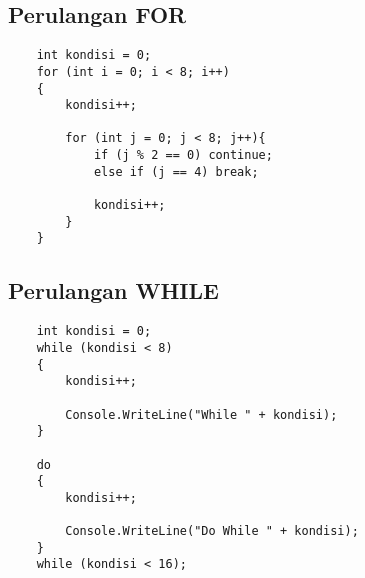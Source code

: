 \documentclass{book}
\begin{document}
	\subsection{Perulangan FOR}
	\begin{lstlisting}
	int kondisi = 0;
	for (int i = 0; i < 8; i++)
	{
		kondisi++;
		
		for (int j = 0; j < 8; j++){
			if (j % 2 == 0) continue;
			else if (j == 4) break;
			
			kondisi++;
		}
	}
	\end{lstlisting}

	\subsection{Perulangan WHILE}
	\begin{lstlisting}
	int kondisi = 0;
	while (kondisi < 8)
	{
		kondisi++;
		
		Console.WriteLine("While " + kondisi);
	}
	
	do
	{
		kondisi++;
		
		Console.WriteLine("Do While " + kondisi);
	}
	while (kondisi < 16);
	\end{lstlisting}
\end{document}
